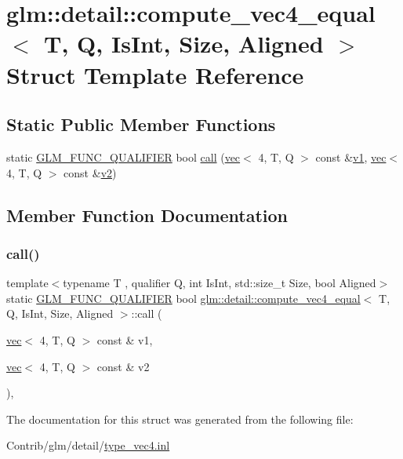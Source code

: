 \hypertarget{structglm_1_1detail_1_1compute__vec4__equal}{}\section{glm\+:\+:detail\+:\+:compute\+\_\+vec4\+\_\+equal$<$ T, Q, Is\+Int, Size, Aligned $>$ Struct Template Reference}
\label{structglm_1_1detail_1_1compute__vec4__equal}
\subsection*{Static Public Member Functions}
\begin{DoxyCompactItemize}
\item 
static \mbox{\hyperlink{setup_8hpp_a33fdea6f91c5f834105f7415e2a64407}{G\+L\+M\+\_\+\+F\+U\+N\+C\+\_\+\+Q\+U\+A\+L\+I\+F\+I\+ER}} bool \mbox{\hyperlink{structglm_1_1detail_1_1compute__vec4__equal_a5b7d0b1229e2c3d669e6937cf4977aa4}{call}} (\mbox{\hyperlink{structglm_1_1vec}{vec}}$<$ 4, T, Q $>$ const \&\mbox{\hyperlink{_s_d_l__opengl__glext_8h_a435c176a02c061b43e19bdf7c86cceae}{v1}}, \mbox{\hyperlink{structglm_1_1vec}{vec}}$<$ 4, T, Q $>$ const \&\mbox{\hyperlink{_s_d_l__opengl__glext_8h_a0928f6d0f0f794ba000a21dfae422136}{v2}})
\end{DoxyCompactItemize}


\subsection{Member Function Documentation}
\mbox{\label{structglm_1_1detail_1_1compute__vec4__equal_a5b7d0b1229e2c3d669e6937cf4977aa4}} 
\subsubsection{\texorpdfstring{call()}{call()}}
{\footnotesize\ttfamily template$<$typename T , qualifier Q, int Is\+Int, std\+::size\+\_\+t Size, bool Aligned$>$ \\
static \mbox{\hyperlink{setup_8hpp_a33fdea6f91c5f834105f7415e2a64407}{G\+L\+M\+\_\+\+F\+U\+N\+C\+\_\+\+Q\+U\+A\+L\+I\+F\+I\+ER}} bool \mbox{\hyperlink{structglm_1_1detail_1_1compute__vec4__equal}{glm\+::detail\+::compute\+\_\+vec4\+\_\+equal}}$<$ T, Q, Is\+Int, Size, Aligned $>$\+::call (\begin{DoxyParamCaption}\item[{\mbox{\hyperlink{structglm_1_1vec}{vec}}$<$ 4, T, Q $>$ const \&}]{v1,  }\item[{\mbox{\hyperlink{structglm_1_1vec}{vec}}$<$ 4, T, Q $>$ const \&}]{v2 }\end{DoxyParamCaption})\hspace{0.3cm}{\ttfamily [inline]}, {\ttfamily [static]}}



The documentation for this struct was generated from the following file\+:\begin{DoxyCompactItemize}
\item 
Contrib/glm/detail/\mbox{\hyperlink{type__vec4_8inl}{type\+\_\+vec4.\+inl}}\end{DoxyCompactItemize}
